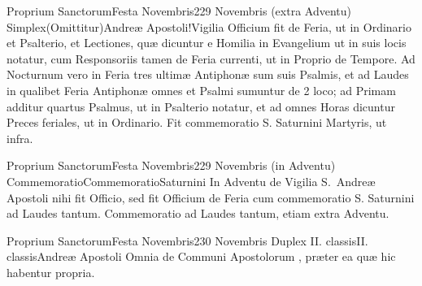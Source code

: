 \documentclass[liber-responsorialis.tex]{subfiles}
\begin{document}
	{Proprium Sanctorum}{Festa Novembris}{2}{29 Novembris (extra Adventu)}
	{Simplex}{(Omittitur)}{Andreæ Apostoli!Vigilia}
	{Officium fit de Feria, ut in Ordinario et Psalterio, et Lectiones, quæ dicuntur e Homilia in Evangelium  ut in suis locis notatur, cum Responsoriis tamen de Feria currenti, ut in Proprio de Tempore. Ad Nocturnum vero in Feria  tres ultimæ Antiphonæ sum suis Psalmis, et ad Laudes in qualibet Feria Antiphonæ omnes et Psalmi sumuntur de 2 loco; ad Primam additur quartus Psalmus, ut in Psalterio notatur, et ad omnes Horas dicuntur Preces feriales, ut in Ordinario.}
	{Fit commemoratio S. Saturnini Martyris, ut infra.}

	{Proprium Sanctorum}{Festa Novembris}{2}{29 Novembris (in Adventu)}
	{Commemoratio}{Commemoratio}{Saturnini}
	{In Adventu de Vigilia S.\ Andreæ Apostoli nihi fit Officio, sed fit Officium de Feria cum commemoratio S. Saturnini ad Laudes tantum.}
	{Commemoratio ad Laudes tantum, etiam extra Adventu.}

	{Proprium Sanctorum}{Festa Novembris}{2}{30 Novembris}
	{Duplex II. classis}{II. classis}{Andreæ Apostoli}
	{Omnia de Communi Apostolorum \pageref{M-APEX}, præter ea quæ hic habentur propria.}
	{}
\tedeumrubric
\end{document}
